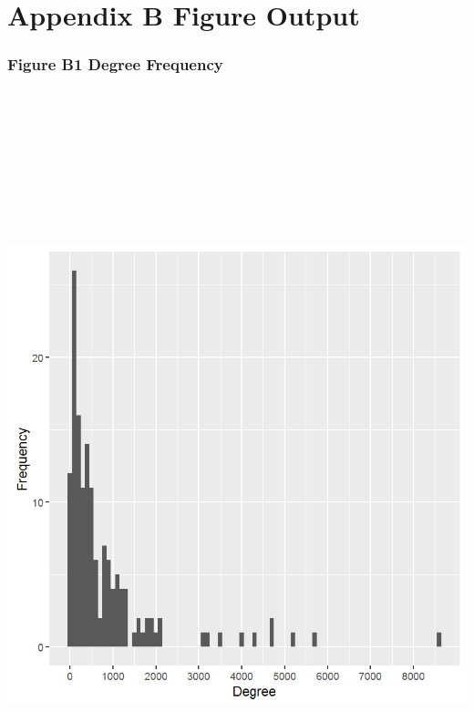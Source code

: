 \documentclass[]{article}
\begin{document}
\newpage

\section{Appendix B Figure Output}\label{appendix-b-figure-output}

\subsubsection{Figure B1 Degree
Frequency}\label{figure-b1-degree-frequency}

\section{\texorpdfstring{\protect\includegraphics[height=8.33333in]{images/deg_freq.png}}{Degree Frequency}}\label{degree-frequency}
\end{document}

